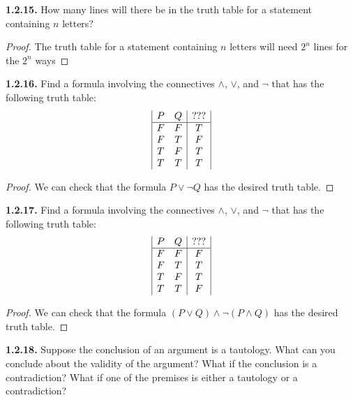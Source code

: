 \documentclass[12pt]{amsart}
\newenvironment{statement}[1]{\smallskip\noindent\color[rgb]{.6627, .3529, .6314} {\bf #1.}}{}
\theoremstyle{definition}
\theoremstyle{remark}
\begin{document}
\begin{statement}{1.2.15}
How many lines will there be in the truth table for a statement containing $n$ letters?
\end{statement}

\begin{proof}
The truth table for a statement containing $n$ letters will need $2^n$ lines for the $2^n$ ways 
\end{proof}


\begin{statement}{1.2.16}
Find a formula involving the connectives $\wedge$, $\vee$, and $\neg$ that has the following truth table:
\begin{equation*}
	\begin{array}{| c c | c |}
		P & Q & ??? \\
		\hline
		F & F & T \\
		F & T & F \\
		T & F & T \\
		T & T & T
	\end{array}
\end{equation*}
\end{statement}

\begin{proof}
We can check that the formula $P \vee \neg Q$ has the desired truth table.
\end{proof}


\begin{statement}{1.2.17}
Find a formula involving the connectives $\wedge$, $\vee$, and $\neg$ that has the following truth table:
\begin{equation*}
	\begin{array}{| c c | c |}
		P & Q & ??? \\
		\hline
		F & F & F \\
		F & T & T \\
		T & F & T \\
		T & T & F
	\end{array}
\end{equation*}
\end{statement}

\begin{proof}
We can check that the formula $(P \vee Q) \wedge \neg (P \wedge Q)$ has the desired truth table.
\end{proof}


\begin{statement}{1.2.18}
Suppose the conclusion of an argument is a tautology.
What can you conclude about the validity of the argument?
What if the conclusion is a contradiction?
What if one of the premises is either a tautology or a contradiction?
\end{statement}
\end{document}
